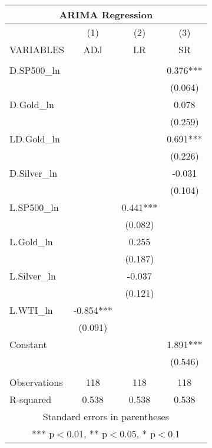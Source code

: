 \documentclass[]{article}
\begin{document}
\begin{tabular}{lccc}
\multicolumn{4}{c}{ARIMA Regression} \\ \hline
 & (1) & (2) & (3) \\
VARIABLES & ADJ & LR & SR \\ \hline
 &  &  &  \\
D.SP500\_ln &  &  & 0.376*** \\
 &  &  & (0.064) \\
D.Gold\_ln &  &  & 0.078 \\
 &  &  & (0.259) \\
LD.Gold\_ln &  &  & 0.691*** \\
 &  &  & (0.226) \\
D.Silver\_ln &  &  & -0.031 \\
 &  &  & (0.104) \\
L.SP500\_ln &  & 0.441*** &  \\
 &  & (0.082) &  \\
L.Gold\_ln &  & 0.255 &  \\
 &  & (0.187) &  \\
L.Silver\_ln &  & -0.037 &  \\
 &  & (0.121) &  \\
L.WTI\_ln & -0.854*** &  &  \\
 & (0.091) &  &  \\
Constant &  &  & 1.891*** \\
 &  &  & (0.546) \\
 &  &  &  \\
Observations & 118 & 118 & 118 \\
 R-squared & 0.538 & 0.538 & 0.538 \\ \hline
\multicolumn{4}{c}{ Standard errors in parentheses} \\
\multicolumn{4}{c}{ *** p$<$0.01, ** p$<$0.05, * p$<$0.1} \\
\end{tabular}
\end{document}
